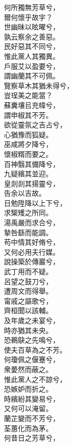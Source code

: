 \begin{pinyinscope}
\begin{shici}
何所獨無芳草兮，\\
爾何懷乎故宇？\\
世幽昧以昡曜兮，\\
孰云察余之善惡。\\
民好惡其不同兮，\\
惟此黨人其獨異。\\
戶服艾以盈要兮，\\
謂幽蘭其不可佩。\\
覽察草木其猶未得兮，\\
豈珵美之能當？\\
蘇糞壤㠯充幃兮，\\
謂申椒其不芳。\\
欲從靈氛之吉占兮，\\
心猶豫而狐疑。\\
巫咸將夕降兮，\\
懷椒糈而要之。\\
百神翳其備降兮，\\
九疑繽其並迎。\\
皇剡剡其揚靈兮，\\
告余以吉故。\\
日勉陞降以上下兮，\\
求榘矱之所同。\\
湯禹嚴而求合兮，\\
摯咎繇而能調。\\
苟中情其好脩兮，\\
又何必用夫行媒。\\
說操築於傳巖兮，\\
武丁用而不疑。\\
呂望之鼓刀兮，\\
遭周文而得舉。\\
甯戚之謳歌兮，\\
齊桓聞以該輔。\\
及年歲之未宴兮，\\
時亦猶其未央。\\
恐鵜鴃之先鳴兮，\\
使夫百草為之不芳。\\
何瓊佩之偃蹇兮，\\
衆薆然而蔽之。\\
惟此黨人之不諒兮，\\
恐嫉妒而折之。\\
時繽紛其變易兮，\\
又何可以淹留。\\
蘭芷變而不芳兮，\\
荃蕙化而為茅。\\
何昔日之芳草兮，\\

\end{shici}
\end{pinyinscope}
